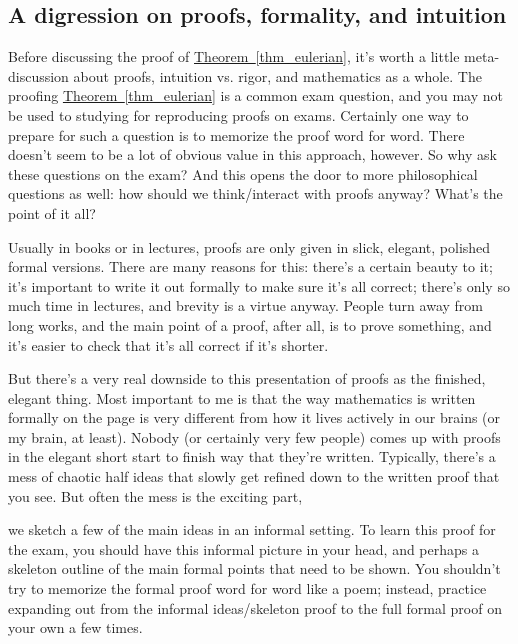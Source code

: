\documentclass[10pt,]{book}
\theoremstyle{plain}
\theoremstyle{definition}
\theoremstyle{definition}
\theoremstyle{definition}
\theoremstyle{definition}
\numberwithin{equation}{section}
\begin{document}
\subsection[{A digression on proofs, formality, and intuition}]{A digression on proofs, formality, and intuition}\label{subsection-18}
\hypertarget{p-125}{}%
Before discussing the proof of \hyperref[thm_eulerian]{Theorem~\ref{thm_eulerian}}, it's worth a little meta-discussion about proofs, intuition vs. rigor, and mathematics as a whole.  The proofing \hyperref[thm_eulerian]{Theorem~\ref{thm_eulerian}} is a common exam question, and you may not be used to studying for reproducing proofs on exams.  Certainly one way to prepare for such a question is to memorize the proof word for word.  There doesn't seem to be a lot of obvious value in this approach, however.  So why ask these questions on the exam? And this opens the door to more philosophical questions as well: how should we think/interact with proofs anyway?  What's the point of it all?%
\par
\hypertarget{p-126}{}%
Usually in books or in lectures, proofs are only given in slick, elegant, polished formal versions.  There are many reasons for this: there's a certain beauty to it; it's important to write it out formally to make sure it's all correct; there's only so much time in lectures, and brevity is a virtue anyway.  People turn away from long works, and the main point of a proof, after all, is to prove something, and it's easier to check that it's all correct if it's shorter.%
\par
\hypertarget{p-127}{}%
But there's a very real downside to this presentation of proofs as the finished, elegant thing.  Most important to me is that the way mathematics is written formally on the page is very different from how it lives actively in our brains (or my brain, at least).  Nobody (or certainly very few people) comes up with proofs in the elegant short start to finish way that they're written.  Typically, there's a mess of chaotic half ideas that slowly get refined down to the written proof that you see.  But often the mess is the exciting part,%
\par
\hypertarget{p-128}{}%
we sketch a few of the main ideas in an informal setting.  To learn this proof for the exam, you should have this informal picture in your head, and perhaps a skeleton outline of the main formal points that need to be shown.  You shouldn't try to memorize the formal proof word for word like a poem; instead, practice expanding out from the informal ideas/skeleton proof to the full formal proof on your own a few times.%
\end{document}
